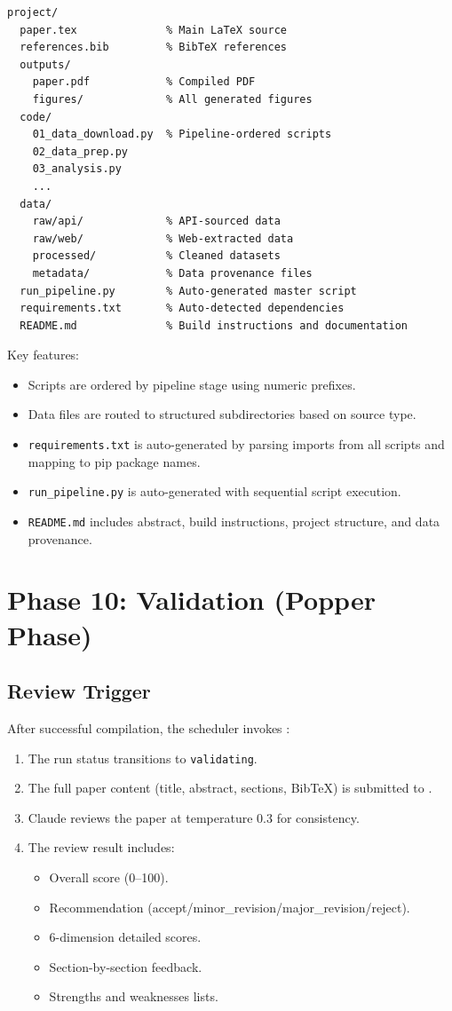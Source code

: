 \begin{verbatim}
project/
  paper.tex              % Main LaTeX source
  references.bib         % BibTeX references
  outputs/
    paper.pdf            % Compiled PDF
    figures/             % All generated figures
  code/
    01_data_download.py  % Pipeline-ordered scripts
    02_data_prep.py
    03_analysis.py
    ...
  data/
    raw/api/             % API-sourced data
    raw/web/             % Web-extracted data
    processed/           % Cleaned datasets
    metadata/            % Data provenance files
  run_pipeline.py        % Auto-generated master script
  requirements.txt       % Auto-detected dependencies
  README.md              % Build instructions and documentation
\end{verbatim}

Key features:
\begin{itemize}
  \item Scripts are ordered by pipeline stage using numeric prefixes.
  \item Data files are routed to structured subdirectories based on source type.
  \item \texttt{requirements.txt} is auto-generated by parsing imports from all scripts and mapping to pip package names.
  \item \texttt{run\_pipeline.py} is auto-generated with sequential script execution.
  \item \texttt{README.md} includes abstract, build instructions, project structure, and data provenance.
\end{itemize}

\section{Phase 10: Validation (Popper Phase)}
\label{sec:pipeline:validation}

\subsection{Review Trigger}

After successful compilation, the scheduler invokes \popper:

\begin{enumerate}
  \item The run status transitions to \texttt{validating}.
  \item The full paper content (title, abstract, sections, BibTeX) is submitted to .
  \item Claude reviews the paper at temperature 0.3 for consistency.
  \item The review result includes:
  \begin{itemize}
    \item Overall score (0--100).
    \item Recommendation (accept/minor\_revision/major\_revision/reject).
    \item 6-dimension detailed scores.
    \item Section-by-section feedback.
    \item Strengths and weaknesses lists.
  \end{itemize}
\end{enumerate}

